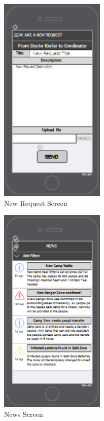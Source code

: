 \begin{figure}[htbp]
\begin{center}
 \caption{\label{fig:A15} New Request Screen}
   \includegraphics[width=50mm]{./images/App/newrequest.eps}
\end{center}
\end{figure}
\begin{figure}[htbp]
\begin{center}
 \caption{\label{fig:A6} News Screen}
   \includegraphics[width=50mm]{./images/App/newsscreen.eps}
\end{center}
\end{figure}
